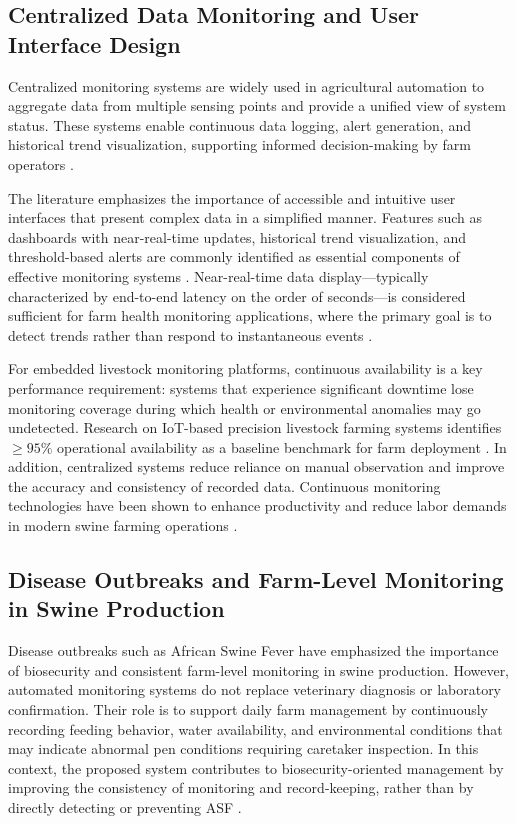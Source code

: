 \subsection{Centralized Data Monitoring and User Interface Design}

Centralized monitoring systems are widely used in agricultural automation to aggregate data from multiple sensing points and provide a unified view of system status. These systems enable continuous data logging, alert generation, and historical trend visualization, supporting informed decision-making by farm operators \cite{beyondtech2025smart, racewicz2021welfare, everypig_nd, jygatech2026vision}.

The literature emphasizes the importance of accessible and intuitive user interfaces that present complex data in a simplified manner. Features such as dashboards with near-real-time updates, historical trend visualization, and threshold-based alerts are commonly identified as essential components of effective monitoring systems \cite{sadeghi2023improving, everypig_nd, jygatech2026vision}. Near-real-time data display---typically characterized by end-to-end latency on the order of seconds---is considered sufficient for farm health monitoring applications, where the primary goal is to detect trends rather than respond to instantaneous events \cite{carvalho2023iot, beyondtech2025smart}.

For embedded livestock monitoring platforms, continuous availability is a key performance requirement: systems that experience significant downtime lose monitoring coverage during which health or environmental anomalies may go undetected. Research on IoT-based precision livestock farming systems identifies $\geq 95\%$ operational availability as a baseline benchmark for farm deployment \cite{carvalho2023iot, adeoye2025animalia}. In addition, centralized systems reduce reliance on manual observation and improve the accuracy and consistency of recorded data. Continuous monitoring technologies have been shown to enhance productivity and reduce labor demands in modern swine farming operations \cite{lo2025rebooting, livestockproduction2026}.

\subsection{Disease Outbreaks and Farm-Level Monitoring in Swine Production}

Disease outbreaks such as African Swine Fever have emphasized the importance of biosecurity and consistent farm-level monitoring in swine production. However, automated monitoring systems do not replace veterinary diagnosis or laboratory confirmation. Their role is to support daily farm management by continuously recording feeding behavior, water availability, and environmental conditions that may indicate abnormal pen conditions requiring caretaker inspection. In this context, the proposed system contributes to biosecurity-oriented management by improving the consistency of monitoring and record-keeping, rather than by directly detecting or preventing ASF \cite{healthforanimals2024prevention}.

